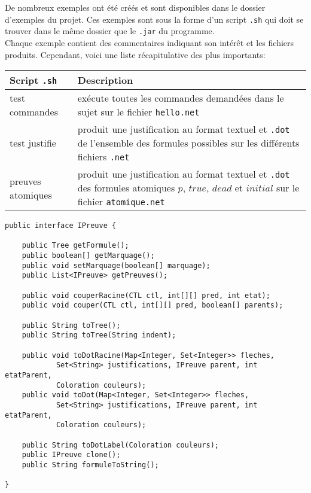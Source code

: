 \documentclass[dvipsnames]{report}
\begin{document}
De nombreux exemples ont été créés et sont disponibles dans le dossier d'exemples du projet. Ces exemples sont sous la forme d'un script \texttt{.sh} qui doit se trouver dans le même dossier que le \texttt{.jar} du programme.\\

Chaque exemple contient des commentaires indiquant son intérêt et les fichiers produits. Cependant, voici une liste récapitulative des plus importants:\\

\noindent\begin{tabularx}{\linewidth}{| @{}l | X@{} |}
\hline
Script \texttt{.sh} & Description \\
\hline
test commandes & exécute toutes les commandes demandées dans le sujet sur le fichier \texttt{hello.net} \\
\hline
test justifie & produit une justification au format textuel et \texttt{.dot} de l'ensemble des formules possibles sur les différents fichiers \texttt{.net} \\
\hline
preuves atomiques & produit une justification au format textuel et \texttt{.dot} des formules atomiques $p$, $true$, $dead$ et $initial$ sur le fichier \texttt{atomique.net} \\
\hline
\end{tabularx}

\newpage

\begin{lstlisting}[caption={Interface \psverb+IPreuve+ commune à toutes les preuves}, label={lst:IPreuve}]
public interface IPreuve {

	public Tree getFormule();
	public boolean[] getMarquage();
	public void setMarquage(boolean[] marquage);
	public List<IPreuve> getPreuves();

	public void couperRacine(CTL ctl, int[][] pred, int etat);
	public void couper(CTL ctl, int[][] pred, boolean[] parents);

	public String toTree();
	public String toTree(String indent);

	public void toDotRacine(Map<Integer, Set<Integer>> fleches,
			Set<String> justifications, IPreuve parent, int etatParent,
			Coloration couleurs);
	public void toDot(Map<Integer, Set<Integer>> fleches,
			Set<String> justifications, IPreuve parent, int etatParent,
			Coloration couleurs);

	public String toDotLabel(Coloration couleurs);
	public IPreuve clone();
	public String formuleToString();

}
\end{lstlisting}
\end{document}
